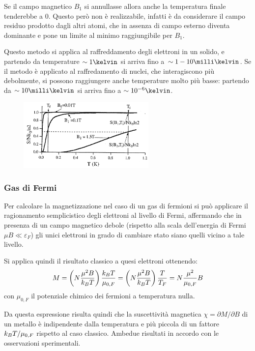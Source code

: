 Se il campo magnetico $ B_1 $ si annullasse allora anche la temperatura finale tenderebbe a $ 0 $. Questo però non è realizzabile, infatti è da considerare il campo residuo prodotto dagli altri atomi, che in assenza di campo esterno diventa dominante e pone un limite al minimo raggiungibile per $ B_1 $.

Questo metodo si applica al raffreddamento degli elettroni in un solido, e partendo da temperature $ \sim 1 \kelvin $ si arriva fino a $ \sim 1-10 \milli\kelvin $. Se il metodo è applicato al raffredamento di nuclei, che interagiscono più debolmente, si possono raggiungere anche temperature molto più basse: partendo da $ \sim 10 \milli\kelvin $ si arriva fino a $ \sim 10^{-6} \kelvin $.

\begin{figure}[h]
	\centering
	\includegraphics[width=0.6\textwidth]{Immagini/DemagnAdiabatica.png}
	\vspace{-10pt}
	\caption{}
	\label{fig:demagnad}
	\vspace{-10pt}
\end{figure}

\subsubsection{Gas di Fermi}

Per calcolare la magnetizzazione nel caso di un gas di fermioni si può applicare il ragionamento semplicistico degli elettroni al livello di Fermi, affermando che in presenza di un campo magnetico debole (rispetto alla scala dell'energia di Fermi $ \mu B \ll \varepsilon_F $) gli unici elettroni in grado di cambiare stato siano quelli vicino a tale livello.

Si applica quindi il risultato classico a quesi elettroni ottenendo:
\[ M = \left(N \frac{\mu^2 B}{k_B T}\right) \frac{k_B T}{\mu_{0,F}} = \left(N \frac{\mu^2 B}{k_B T}\right) \frac{T}{T_{F}} = N \frac{\mu^2}{\mu_{0,F}} B\]
con $ \mu_{0,F} $ il potenziale chimico dei fermioni a temperatura nulla. 

Da questa espressione risulta quindi che la suscettività magnetica $ \chi = \partial M/\partial B $ di un metallo è indipendente dalla temperatura e più piccola di un fattore $ k_B T/\mu_{0,F} $ rispetto al caso classico. Ambedue risultati in accordo con le osservazioni sperimentali.

